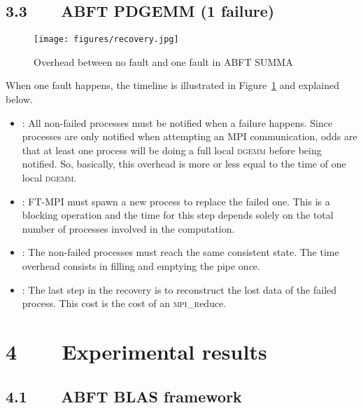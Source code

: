 \documentclass[pdftex,11pt]{article}
\begin{document}
\subsection*{\color{DodgerBlue4}3.3~~~~ABFT PDGEMM (1 failure)}

\begin{figure}
\color{DodgerBlue4}
\begin{center}
\texttt{[image: figures/recovery.jpg]}
\end{center}
\caption{\label{fig:recovery}
\color{black}
Overhead between no fault and one fault in ABFT SUMMA
}
\end{figure}

When one fault happens, the timeline is illustrated in
Figure~\ref{fig:recovery} and explained below.

\begin{itemize}

\item : All non-failed processes must
  be notified when a failure happens.  Since processes are only
  notified when attempting an MPI communication, odds are that at
  least one process will be doing a full local \textsc{dgemm} before
  being notified. So, basically, this overhead is more or less equal
  to the time of one local \textsc{dgemm}.

\item : FT-MPI must spawn a new process
  to replace the failed one. This is a blocking operation and the time
  for this step depends solely on the total number of processes
  involved in the computation.

\item : The non-failed processes must
  reach the same consistent state. The time overhead consists in
  filling and emptying the pipe once.

\item : The last step in the recovery is
  to reconstruct the lost data of the failed process. This cost is the
  cost of an \textsc{mpi\_r}educe.

\end{itemize}

\section*{\color{DodgerBlue4}4~~~~Experimental results}

\subsection*{\color{DodgerBlue4} 4.1~~~~ABFT BLAS framework}
\end{document}
